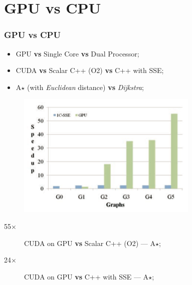 \section{GPU vs CPU}

\begin{frame}
	\frametitle{GPU vs CPU}
	\begin{itemize}
		\item GPU \textbf{vs} Single Core \textbf{vs} Dual Processor;
		\item CUDA \textbf{vs} Scalar C++ (O2) \textbf{vs} C++ with SSE;
		\item A$\star$ (with \textit{Euclidean} distance) \textbf{vs} \textit{Dijkstra};
	\end{itemize}
	\begin{figure}
		\centering
		\includegraphics[width=.5\textwidth]{images/speedups.png}
	\end{figure}
	\begin{description}
		\item [55$\times$] CUDA on GPU \textbf{vs} Scalar C++ (O2) --- A$\star$;
		\item [24$\times$] CUDA on GPU \textbf{vs} C++ with SSE --- A$\star$;
	\end{description}
\end{frame}